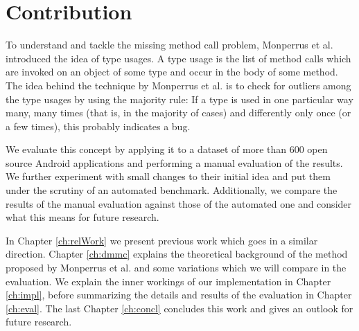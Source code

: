 
\section{Contribution}

To understand and tackle the missing method call problem, Monperrus et al. \cite{monperrus2010detecting}\cite{monperrus2013detecting} introduced the idea of type usages.
A type usage is the list of method calls which are invoked on an object of some type and occur in the body of some method.
The idea behind the technique by Monperrus et al. is to check for outliers among the type usages by using the majority rule:
If a type is used in one particular way many, many times (that is, in the majority of cases) and differently only once (or a few times), this probably indicates a bug.

We evaluate this concept by applying it to a dataset of more than 600 open source Android applications and performing a manual evaluation of the results.
We further experiment with small changes to their initial idea and put them under the scrutiny of an automated benchmark.
Additionally, we compare the results of the manual evaluation against those of the automated one and consider what this means for future research.

In Chapter \ref{ch:relWork} we present previous work which goes in a similar direction.
Chapter \ref{ch:dmmc} explains the theoretical background of the method proposed by Monperrus et al. and some variations which we will compare in the evaluation.
We explain the inner workings of our implementation in Chapter \ref{ch:impl}, before summarizing the details and results of the evaluation in Chapter \ref{ch:eval}.
The last Chapter \ref{ch:concl} concludes this work and gives an outlook for future research.


